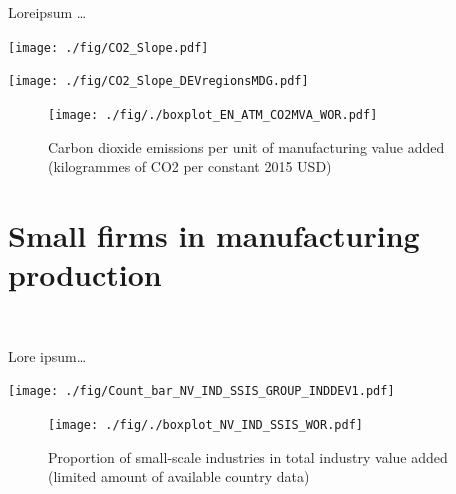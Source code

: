 \documentclass[
  openany, nofonts]{tufte-book}
\begin{document}
Loreipsum \ldots{}

\begin{marginfigure}
\texttt{[image: ./fig/CO2\_Slope.pdf]} \end{marginfigure}

\vspace*{\fill}

\begin{flushright}\texttt{[image: ./fig/CO2\_Slope\_DEVregionsMDG.pdf]} \end{flushright}

\vspace*{\fill}

\begin{figure}
\texttt{[image: ./fig/./boxplot\_EN\_ATM\_CO2MVA\_WOR.pdf]} \caption[CO2 emissions per unit of manufacturing value added]{Carbon dioxide emissions per unit of manufacturing value added (kilogrammes of CO2 per constant 2015 USD)}\label{fig:c07-co2mva}
\end{figure}

\pagebreak

\hypertarget{small-firms-in-manufacturing-production}{%
\section{Small firms in manufacturing production}\label{small-firms-in-manufacturing-production}}

~

Lore ipsum\ldots{}

\begin{marginfigure}
\texttt{[image: ./fig/Count\_bar\_NV\_IND\_SSIS\_GROUP\_INDDEV1.pdf]} \end{marginfigure}

\vspace*{\fill}

\begin{figure}
\texttt{[image: ./fig/./boxplot\_NV\_IND\_SSIS\_WOR.pdf]} \caption[Proportion of small-scale industries]{Proportion of small-scale industries in total industry value added (limited amount of available country data)}\label{fig:c07-small-box1}
\end{figure}

\clearpage\pagebreak
\end{document}
